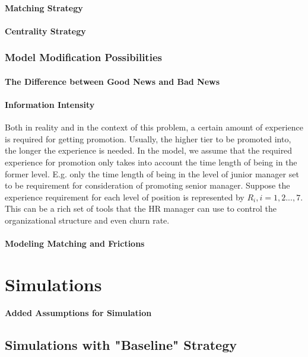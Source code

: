 \documentclass[tcn = 37075, sheet = true, abstract = true]{mcmthesis}
\begin{document}
\paragraph{Matching Strategy}


\paragraph{Centrality Strategy}


\subsubsection{Model Modification Possibilities}

\paragraph{The Difference between Good News and Bad News}

\paragraph{Information Intensity}

Both in reality and in the context of this problem, a certain amount of experience is required for getting promotion. Usually, the higher tier to be promoted into, the longer the experience is needed. In the model, we assume that the required experience for promotion only takes into account the time length of being in the former level. E.g. only the time length of being in the level of junior manager set to be requirement for consideration of promoting senior manager. Suppose the experience requirement for each level of position is represented by $R_i, i = 1, 2...,7$. This can be a rich set of tools that the HR manager can use to control the organizational structure and even churn rate.

\paragraph{Modeling Matching and Frictions}



\section{Simulations}

\textbf{Added Assumptions for Simulation}

\subsection{Simulations with "Baseline" Strategy}
\end{document}
